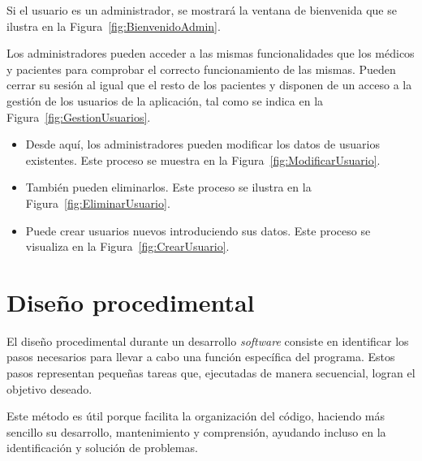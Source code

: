 Si el usuario es un administrador, se mostrará la ventana de bienvenida que se ilustra en la Figura~\ref{fig:BienvenidoAdmin}.



Los administradores pueden acceder a las mismas funcionalidades que los médicos y pacientes para comprobar el correcto funcionamiento de las mismas. Pueden cerrar su sesión al igual que el resto de los pacientes y disponen de un acceso a la gestión de los usuarios de la aplicación, tal como se indica en la Figura~\ref{fig:GestionUsuarios}.


\begin{itemize}
    \item Desde aquí, los administradores pueden modificar los datos de usuarios existentes. Este proceso se muestra en la Figura~\ref{fig:ModificarUsuario}. 
    
    \item También pueden eliminarlos. Este proceso se ilustra en la Figura~\ref{fig:EliminarUsuario}.
    
    \item Puede crear usuarios nuevos introduciendo sus datos. Este proceso se visualiza en la Figura~\ref{fig:CrearUsuario}.
\end{itemize}






\section{Diseño procedimental}
El diseño procedimental durante un desarrollo \textit{software} consiste en identificar los pasos necesarios para llevar a cabo una función específica del programa. Estos pasos representan pequeñas tareas que, ejecutadas de manera secuencial, logran el objetivo deseado.

Este método es útil porque facilita la organización del código, haciendo más sencillo su desarrollo, mantenimiento y comprensión, ayudando incluso en la identificación y solución de problemas.

